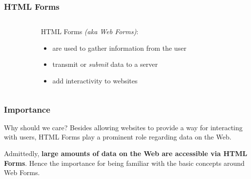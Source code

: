 \documentclass{beamer}\usepackage[]{graphicx}\usepackage[]{color}
\begin{document}
\begin{frame}
\frametitle{HTML Forms}

\begin{columns}[t]
\begin{column}{0.1\textwidth}
\end{column}
\begin{column}{0.8\textwidth}

\begin{block}{HTML Forms \textit{(aka Web Forms)}:}
\begin{itemize}
 \item are used to gather information from the user
 \item transmit or \textit{submit} data to a server
 \item add interactivity to websites
\end{itemize}
\end{block}

\end{column}
\begin{column}{0.1\textwidth}
\end{column}
\end{columns}

\end{frame}


\begin{frame}[fragile]
\frametitle{Importance}

\begin{block}{Why should we care?}
Besides allowing websites to provide a way for interacting with users, HTML Forms play a prominent role regarding data on the Web.

\bigskip 

Admittedly, \textbf{large amounts of data on the Web are accessible via HTML Forms}. Hence the importance for being familiar with the basic concepts around Web Forms.
\end{block}

\end{frame}

\end{document}
